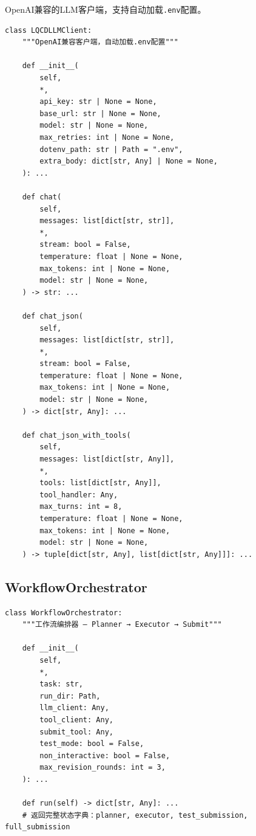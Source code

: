 \documentclass[12pt,a4paper]{ctexart}
\begin{document}
OpenAI兼容的LLM客户端，支持自动加载\texttt{.env}配置。

\begin{lstlisting}[caption={LQCDLLMClient 接口}]
class LQCDLLMClient:
    """OpenAI兼容客户端，自动加载.env配置"""

    def __init__(
        self,
        *,
        api_key: str | None = None,
        base_url: str | None = None,
        model: str | None = None,
        max_retries: int | None = None,
        dotenv_path: str | Path = ".env",
        extra_body: dict[str, Any] | None = None,
    ): ...

    def chat(
        self,
        messages: list[dict[str, str]],
        *,
        stream: bool = False,
        temperature: float | None = None,
        max_tokens: int | None = None,
        model: str | None = None,
    ) -> str: ...

    def chat_json(
        self,
        messages: list[dict[str, str]],
        *,
        stream: bool = False,
        temperature: float | None = None,
        max_tokens: int | None = None,
        model: str | None = None,
    ) -> dict[str, Any]: ...

    def chat_json_with_tools(
        self,
        messages: list[dict[str, Any]],
        *,
        tools: list[dict[str, Any]],
        tool_handler: Any,
        max_turns: int = 8,
        temperature: float | None = None,
        max_tokens: int | None = None,
        model: str | None = None,
    ) -> tuple[dict[str, Any], list[dict[str, Any]]]: ...
\end{lstlisting}

\subsection{WorkflowOrchestrator}

\begin{lstlisting}[caption={WorkflowOrchestrator 接口}]
class WorkflowOrchestrator:
    """工作流编排器 — Planner → Executor → Submit"""

    def __init__(
        self,
        *,
        task: str,
        run_dir: Path,
        llm_client: Any,
        tool_client: Any,
        submit_tool: Any,
        test_mode: bool = False,
        non_interactive: bool = False,
        max_revision_rounds: int = 3,
    ): ...

    def run(self) -> dict[str, Any]: ...
    # 返回完整状态字典：planner, executor, test_submission, full_submission
\end{lstlisting}
\end{document}

